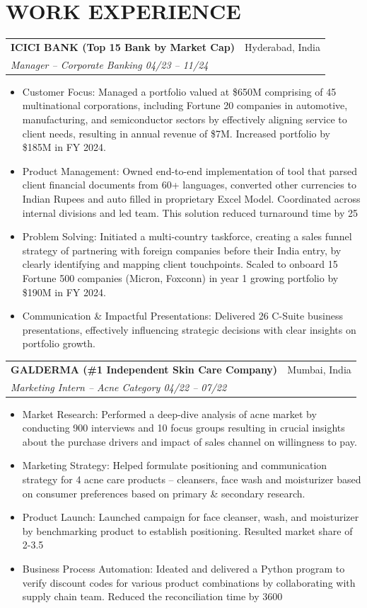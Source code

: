 \documentclass[10pt,letterpaper]{article}
\makeatletter
\newcommand{\resumeEntry}[4]{%
  \begin{tabularx}{\textwidth}{@{}Xr@{}}
    \textbf{#1} #2 & #3 \\
    \textit{#4} & \\
  \end{tabularx}
}
\makeatother
\begin{document}
\section*{WORK EXPERIENCE}
\resumeEntry{ICICI BANK (Top 15 Bank by Market Cap)}{}{Hyderabad, India}{Manager -- Corporate Banking \hfill 04/23 -- 11/24}
\begin{itemize}
  \item Customer Focus: Managed a portfolio valued at \$650M comprising of 45 multinational corporations, including Fortune 20 companies in automotive, manufacturing, and semiconductor sectors by effectively aligning service to client needs, resulting in annual revenue of \$7M. Increased portfolio by \$185M in FY 2024.
  \item Product Management: Owned end-to-end implementation of tool that parsed client financial documents from 60+ languages, converted other currencies to Indian Rupees and auto filled in proprietary Excel Model. Coordinated across internal divisions and led team. This solution reduced turnaround time by 25%
  \item Problem Solving: Initiated a multi-country taskforce, creating a sales funnel strategy of partnering with foreign companies before their India entry, by clearly identifying and mapping client touchpoints. Scaled to onboard 15 Fortune 500 companies (Micron, Foxconn) in year 1 growing portfolio by \$190M in FY 2024.
  \item Communication \& Impactful Presentations: Delivered 26 C-Suite business presentations, effectively influencing strategic decisions with clear insights on portfolio growth.
\end{itemize}

\resumeEntry{GALDERMA (\#1 Independent Skin Care Company)}{}{Mumbai, India}{Marketing Intern -- Acne Category \hfill 04/22 -- 07/22}
\begin{itemize}
  \item Market Research: Performed a deep-dive analysis of acne market by conducting 900 interviews and 10 focus groups resulting in crucial insights about the purchase drivers and impact of sales channel on willingness to pay.
  \item Marketing Strategy: Helped formulate positioning and communication strategy for 4 acne care products -- cleansers, face wash and moisturizer based on consumer preferences based on primary \& secondary research.
  \item Product Launch: Launched campaign for face cleanser, wash, and moisturizer by benchmarking product to establish positioning. Resulted market share of 2-3.5%
  \item Business Process Automation: Ideated and delivered a Python program to verify discount codes for various product combinations by collaborating with supply chain team. Reduced the reconciliation time by 3600%
\end{itemize}
\end{document}
